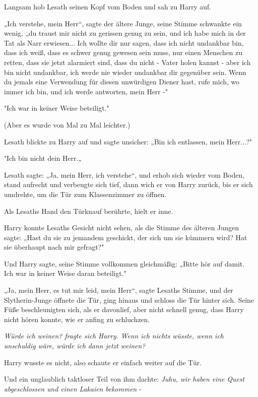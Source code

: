 {Langsam hob Lesath seinen Kopf vom Boden und sah zu Harry auf.

„Ich verstehe, mein Herr“, sagte der ältere Junge, seine Stimme schwankte ein wenig, „du traust mir nicht zu gerissen genug zu sein, und ich habe mich in der Tat als Narr erwiesen... Ich wollte dir nur sagen, dass ich nicht undankbar bin, dass ich weiß, dass es schwer genug gewesen sein muss, nur einen Menschen zu retten, dass sie jetzt alarmiert sind, dass du nicht - Vater holen kannst - aber ich bin nicht undankbar, ich werde nie wieder undankbar dir gegenüber sein. Wenn du jemals eine Verwendung für diesen unwürdigen Diener hast, rufe mich, wo immer ich bin, und ich werde antworten, mein Herr -"

"Ich war in keiner Weise beteiligt."

(Aber es wurde von Mal zu Mal leichter.)

Lesath blickte zu Harry auf und sagte unsicher: „Bin ich entlassen, mein Herr...?"

"Ich bin nicht dein Herr.„

Lesath sagte: „Ja, mein Herr, ich verstehe“, und erhob sich wieder vom Boden, stand aufrecht und verbeugte sich tief, dann wich er von Harry zurück, bis er sich umdrehte, um die Tür zum Klassenzimmer zu öffnen.

Als Lesaths Hand den Türknauf berührte, hielt er inne.

Harry konnte Lesaths Gesicht nicht sehen, als die Stimme des älteren Jungen sagte: „Hast du sie zu jemandem geschickt, der sich um sie kümmern wird? Hat sie überhaupt nach mir gefragt?"

Und Harry sagte, seine Stimme vollkommen gleichmäßig: „Bitte hör auf damit. Ich war in keiner Weise daran beteiligt."

„Ja, mein Herr, es tut mir leid, mein Herr“, sagte Lesaths Stimme, und der Slytherin-Junge öffnete die Tür, ging hinaus und schloss die Tür hinter sich. Seine Füße beschleunigten sich, als er davonlief, aber nicht schnell genug, dass Harry nicht hören konnte, wie er anfing zu schluchzen.

\emph{\emph{Würde ich weinen?} fragte sich Harry. \emph{Wenn ich nichts wüsste, wenn ich unschuldig wäre, würde ich dann jetzt weinen?}}

Harry wusste es nicht, also schaute er einfach weiter auf die Tür.

Und ein unglaublich taktloser Teil von ihm dachte: \emph{Juhu, wir haben eine Quest abgeschlossen und einen Lakaien bekommen} -

}
